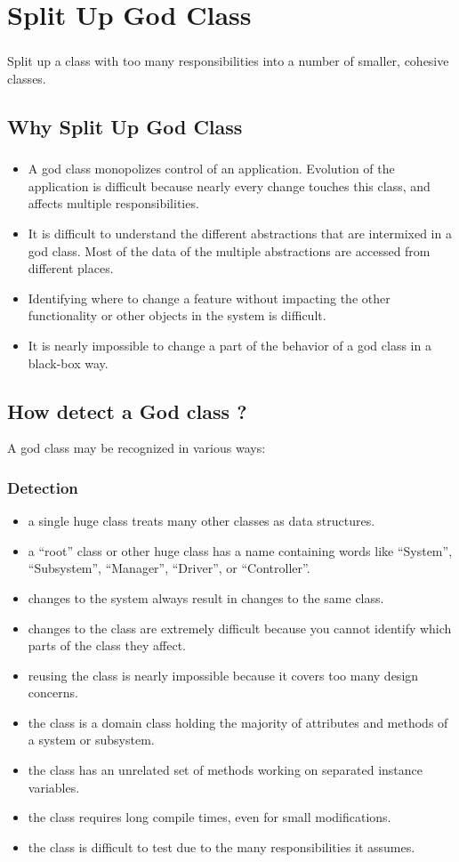 \documentclass{beamer}
\begin{document}
\section{Split Up God Class}
\begin{frame}
\frametitle{}
Split up a class with too many responsibilities into a number of smaller, cohesive classes.
\end{frame}

\subsection{Why Split Up God Class}
\begin{frame}
\frametitle{}
\begin{itemize}
\item A god class monopolizes control of an application. Evolution of the application is difficult because nearly every change touches this class, and affects multiple responsibilities.
\item It is difficult to understand the different abstractions that are intermixed in a god class. Most of the data of the multiple abstractions are accessed from different places.
\item Identifying where to change a feature without impacting the other functionality or other objects in the system is difficult.
\item It is nearly impossible to change a part of the behavior of a god class in a black-box way.
\end{itemize}
\end{frame}


\subsection{How detect a God class ?}
A god class may be recognized in various ways:
\begin{frame}
\frametitle{Detection}
\begin{itemize}
\item a single huge class treats many other classes as data structures.
\item a “root” class or other huge class has a name containing words like “System”, “Subsystem”, “Manager”, “Driver”, or “Controller”.
\item changes to the system always result in changes to the same class.
\item changes to the class are extremely difficult because you cannot identify which parts of the class they affect.
\item reusing the class is nearly impossible because it covers too many design concerns.
\item the class is a domain class holding the majority of attributes and methods of a system or subsystem.
\item the class has an unrelated set of methods working on separated instance variables.
\item the class requires long compile times, even for small modifications.
\item the class is difficult to test due to the many responsibilities it assumes.
\end{itemize}
\end{frame}
\end{document}
